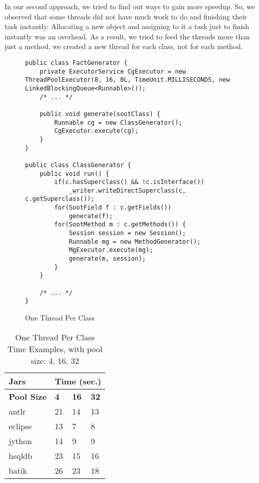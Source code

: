 \documentclass{dithesis}
\begin{document}
        In our second approach, we tried to find out ways to gain more speedup. So, we observed that some threads did not have much work to do and finishing their task instantly. Allocating a new object and assigning to it a task just to finish instantly was an overhead. As a result, we tried to feed the threads more than just a method, we created a new thread for each class, not for each method.  
        \begin{figure}[H]
\begin{lstlisting}
public class FactGenerator {
    private ExecutorService CgExecutor = new ThreadPoolExecutor(8, 16, 0L, TimeUnit.MILLISECONDS, new LinkedBlockingQueue<Runnable>());
    /* ... */

    public void generate(sootClass) {
        Runnable cg = new ClassGenerator();
        CgExecutor.execute(cg);
    }
}

public class ClassGenerator {
    public void run() {
        if(c.hasSuperclass() && !c.isInterface())
            _writer.writeDirectSuperclass(c, c.getSuperclass());
        for(SootField f : c.getFields())
            generate(f);
        for(SootMethod m : c.getMethods()) {
            Session session = new Session();
            Runnable mg = new MethodGenerator();
            MgExecutor.execute(mg);
            generate(m, session);
        }
    }

    /* ... */
}
\end{lstlisting}
        \caption{One Thread Per Class}
        \end{figure}

        \begin{table}[H]
			\centering
\begin{tabular}{@{}l|lll@{}}
\toprule
\textbf{Jars}    	& \multicolumn{3}{l}{\textbf{Time (sec.)}}  \\ \midrule
\textbf{Pool Size} 	& \textbf{4}  & \textbf{16}  & \textbf{32}  \\ \midrule
antlr            	& 21          & 14           & 13           \\
eclipse          	& 13          & 7            & 8            \\
jython           	& 14          & 9            & 9            \\
hsqldb           	& 23          & 15           & 16           \\
batik            	& 26          & 23           & 18           \\ \bottomrule
\end{tabular}
			\caption{One Thread Per Class Time Examples, with pool size: 4, 16, 32}
		\end{table}
\end{document}
